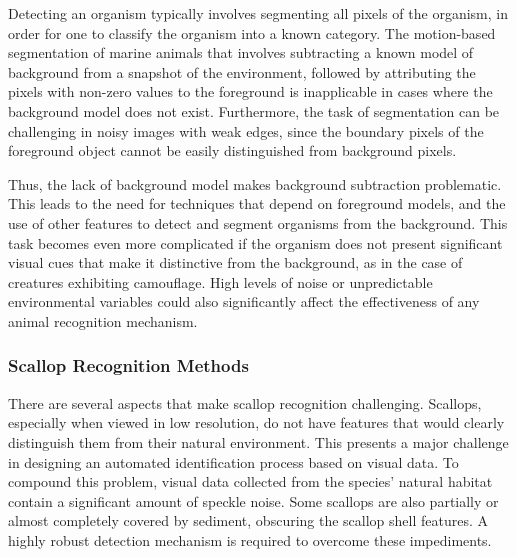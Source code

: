 \documentclass {udthesis}
\begin{document}
Detecting an organism typically involves segmenting all pixels of the organism, in order for one to classify the organism into a known category. 
The motion-based segmentation of marine animals that involves subtracting a known model of background from a snapshot of the environment, followed by attributing the pixels with non-zero values to the foreground is inapplicable in cases where the background model does not exist. 
Furthermore, the task of segmentation can be challenging in noisy images with weak edges, since the boundary pixels of the foreground object cannot be easily distinguished from background pixels.

Thus, the lack of background model makes background subtraction problematic. This leads to the need for techniques that depend on foreground models, and the use of other features to detect and segment organisms from the background. This task becomes even more complicated if the organism does not present significant visual cues that make it distinctive from the background, as in the case of creatures exhibiting camouflage. High levels of noise or unpredictable environmental variables could also significantly affect the effectiveness of any animal recognition mechanism.


\subsubsection{Scallop Recognition Methods}


There are several aspects that make scallop recognition challenging.
Scallops, especially when viewed in low resolution, do not have features
that would clearly distinguish them from their natural environment.  This
presents a major challenge in designing an automated identification process 
based on visual data.  To compound this problem, visual data collected
from the species' natural habitat contain a
significant amount of speckle noise.
Some scallops are also partially or almost completely
covered by sediment, obscuring the scallop shell features.
A highly robust detection mechanism is required to overcome these impediments.
\end{document}
